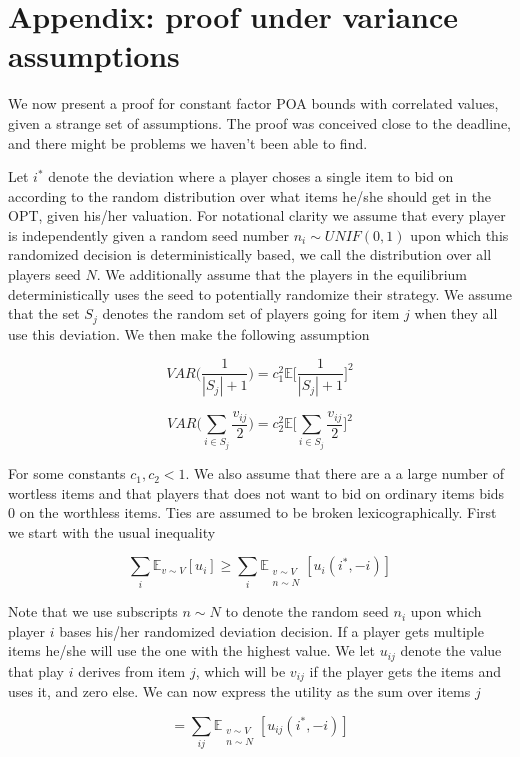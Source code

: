 \section{Appendix: proof under variance assumptions}


We now present a proof for constant factor POA bounds with correlated values, given a strange set of assumptions. The proof was conceived close to the deadline, and there might be problems we haven't been able to find.


Let $i^*$ denote the deviation where a player choses a single item to bid on according to the random distribution over what items he/she should get in the OPT, given his/her valuation. For notational clarity we assume that every player is independently given a random seed number $n_i \sim UNIF(0,1)$ upon which this randomized decision is deterministically based, we call the distribution over all players seed $N$. We additionally assume that the players in the equilibrium deterministically uses the seed to potentially randomize their strategy. We assume that the set $S_j$ denotes the random set of players going for item $j$ when they all use this deviation. We then make the following assumption

$$
VAR \bigg(\frac{1}{|S_j|+1} \bigg) = c_1^2  \mathbb{E} \bigg[ \frac{1}{|S_j|+1}   \bigg]^2
$$


$$
VAR \bigg(\sum_{i \in S_j} \frac{v_{ij}}{2} \bigg) = c_2^2 \mathbb{E} \bigg[ \sum_{i \in S_j} \frac{v_{ij}}{2} \bigg]^2
$$


For some constants $c_1, c_2 < 1$. We also assume that there are a a large number of wortless items and that players that does not want to bid on ordinary items bids 0 on the worthless items. Ties are assumed to be broken lexicographically. First we start with the usual inequality

$$
\sum_i \mathbb{E}_{v \sim V} [ u_i] \ge  \sum_i \mathbb{E}_{ \substack{ v \sim V \\ n \sim N }} [ u_i(i^*, -i)] 
$$

Note that we use subscripts $n \sim N$ to denote the random seed $n_i$ upon which player $i$ bases his/her randomized deviation decision. If a player gets multiple items he/she will use the one with the highest value. We let $u_{ij}$ denote the value that play $i$ derives from item $j$, which will be $v_{ij}$ if the player gets the items and uses it, and zero else. We can now express the utility as the sum over items $j$

$$
= \sum_{ij} \mathbb{E}_{ \substack{ v \sim V \\ n \sim N }} [ u_{ij}(i^*, -i)]
$$


